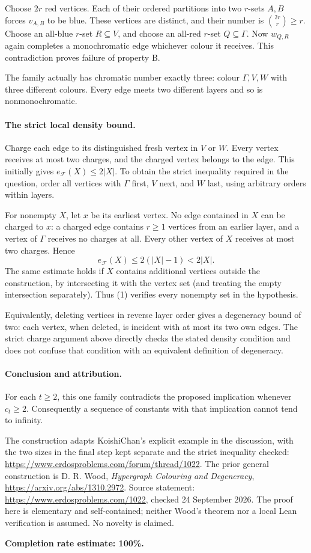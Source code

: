 Choose \(2r\) red vertices. Each of their ordered partitions into two \(r\)-sets \(A,B\) forces \(v_{A,B}\) to be blue. These vertices are distinct, and their number is \(\binom{2r}{r}\geq r\). Choose an all-blue \(r\)-set \(R\subseteq V\), and choose an all-red \(r\)-set \(Q\subseteq\Gamma\). Now \(w_{Q,R}\) again completes a monochromatic edge whichever colour it receives. This contradiction proves failure of property B.

The family actually has chromatic number exactly three: colour \(\Gamma,V,W\) with three different colours. Every edge meets two different layers and so is nonmonochromatic.

\paragraph{The strict local density bound.}
Charge each edge to its distinguished fresh vertex in \(V\) or \(W\). Every vertex receives at most two charges, and the charged vertex belongs to the edge. This initially gives
\(e_{\mathcal F}(X)\leq2|X|\). To obtain the strict inequality required in the question, order all vertices with \(\Gamma\) first, \(V\) next, and \(W\) last, using arbitrary orders within layers.

For nonempty \(X\), let \(x\) be its earliest vertex. No edge contained in \(X\) can be charged to \(x\): a charged edge contains \(r\geq1\) vertices from an earlier layer, and a vertex of \(\Gamma\) receives no charges at all. Every other vertex of \(X\) receives at most two charges. Hence
\[
 e_{\mathcal F}(X)\leq2(|X|-1)<2|X|. \tag{1}
\]
The same estimate holds if \(X\) contains additional vertices outside the construction, by intersecting it with the vertex set (and treating the empty intersection separately). Thus (1) verifies every nonempty set in the hypothesis.

Equivalently, deleting vertices in reverse layer order gives a degeneracy bound of two: each vertex, when deleted, is incident with at most its two own edges. The strict charge argument above directly checks the stated density condition and does not confuse that condition with an equivalent definition of degeneracy.

\paragraph{Conclusion and attribution.}
For each \(t\geq2\), this one family contradicts the proposed implication whenever \(c_t\geq2\). Consequently a sequence of constants with that implication cannot tend to infinity.

The construction adapts KoishiChan's explicit example in the discussion, with the two sizes in the final step kept separate and the strict inequality checked:
\url{https://www.erdosproblems.com/forum/thread/1022}.
The prior general construction is D. R. Wood, \emph{Hypergraph Colouring and Degeneracy}, \url{https://arxiv.org/abs/1310.2972}. Source statement: \url{https://www.erdosproblems.com/1022}, checked 24 September 2026. The proof here is elementary and self-contained; neither Wood's theorem nor a local Lean verification is assumed. No novelty is claimed.

\textbf{Completion rate estimate: 100\%.}
